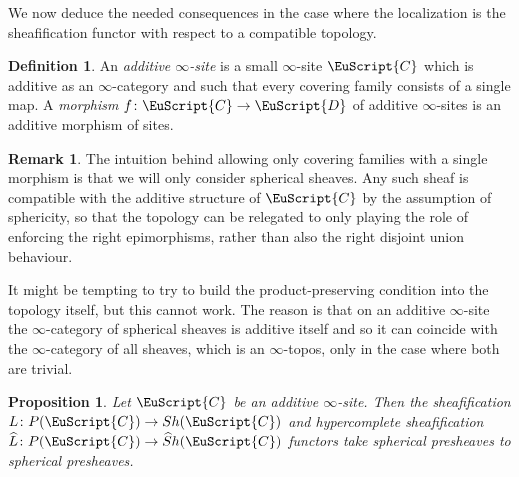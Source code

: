 \documentclass[oneside,a4paper]{amsart}
\newcommand{\euscr}[1]{\EuScript{#1}} %
\newcommand{\ccat}{\euscr{C}} %
\newcommand{\dcat}{\euscr{D}} %
\newcommand{\hpsheaves}{\widehat{S}h} %
\theoremstyle{plain}
\newtheorem{prop}[thm]{Proposition}
\theoremstyle{definition}
\newtheorem{defin}[thm]{Definition}
\newtheorem{rem}[thm]{Remark}
\theoremstyle{remark}
\begin{document}
We now deduce the needed consequences in the case where the localization is the sheafification functor with respect to a compatible topology.

\begin{defin}
\label{defin:additive_infinity_site}
An \emph{additive $\infty$-site} is a small $\infty$-site $\ccat$ which is additive as an $\infty$-category and such that every covering family consists of a single map. A \emph{morphism} $f \colon \ccat \rightarrow \dcat$ of additive $\infty$-sites is an additive morphism of sites. 
\end{defin}

\begin{rem}
The intuition behind allowing only covering families with a single morphism is that we will only consider spherical sheaves. Any such sheaf is compatible with the additive structure of $\ccat$ by the assumption of sphericity, so that the topology can be relegated to only playing the role of enforcing the right epimorphisms, rather than also the right disjoint union behaviour.

It might be tempting to try to build the product-preserving condition into the topology itself, but this cannot work. The reason is that on an additive $\infty$-site the $\infty$-category of spherical sheaves is additive itself and so it can coincide with the $\infty$-category of all sheaves, which is an $\infty$-topos, only in the case where both are trivial. 
\end{rem}

\begin{prop}
\label{prop:sphercity_preserved_by_sheafification}
Let $\ccat$ be an additive $\infty$-site. Then the sheafification $L \colon P(\ccat) \rightarrow Sh(\ccat)$ and hypercomplete sheafification $\widehat{L} \colon P(\ccat) \rightarrow \hpsheaves(\ccat)$ functors take spherical presheaves to spherical presheaves. 
\end{prop}
\end{document}
